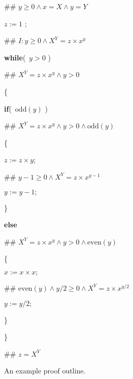 \documentclass[muchmore,11pt]{article}%
\begin{document}
\begin{figure}[tb]%


\begin{code}
\#\# $y\geq0\wedge x=X\wedge y=Y$

$z:=1$ ;

\#\# $I:y\geq0\wedge X^{Y}=z\times x^{y}$

\textbf{while}(\ $y>0$ )

\#\# $X^{Y}=z\times x^{y}\wedge y>0$

\{

\begin{indent}
\item \textbf{if}(\ $\mathrm{odd}(y)$ )

\item \#\# $X^{Y}=z\times x^{y}\wedge y>0\wedge\mathrm{odd}(y)$

\item \{

\begin{indent}
\item $z:=z\times y$;

\item \#\# $y-1\geq0\wedge X^{Y}=z\times x^{y-1}$

\item $y:=y-1;$
\end{indent}

\item \}

\item \textbf{else}

\item \#\# $X^{Y}=z\times x^{y}\wedge y>0\wedge\mathrm{even}(y)$

\item \{

\begin{indent}
\item $x:=x\times x;$

\item \#\# $\mathrm{even}(y)\wedge y/2\geq0\wedge X^{Y}=z\times x^{y/2}$

\item $y:=y/2;$
\end{indent}

\item \}
\end{indent}

\}

\#\# $z=X^{Y}$
\end{code}

%

\caption{An example proof outline.}\label{po}\end{figure}%
\end{document}
